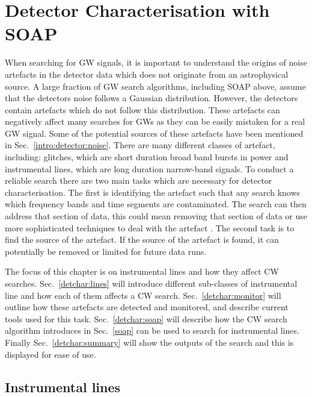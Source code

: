 \chapter{\label{detchar}Detector Characterisation with SOAP}

When searching for \gls{GW} signals, it is important to understand the origins of noise artefacts in the detector data which does not originate from an astrophysical source.
A large fraction of \gls{GW} search algorithms, including SOAP above, assume that the detectors noise follows a Gaussian distribution.
However, the detectors contain artefacts which do not follow this distribution. 
These artefacts can negatively affect many searches for \glspl{GW} as they can be easily mistaken for a real \gls{GW} signal.
Some of the potential sources of these artefacts have been mentioned in Sec.~\ref{intro:detector:noise}. 
There are many different classes of artefact, including: glitches, which are short duration broad band bursts in power and instrumental lines, which are long duration narrow-band signals.
To conduct a reliable search there are two main tasks which are necessary for detector characterisation.
The first is identifying the artefact such that any search knows which frequency bands and time segments are contaminated.
The search can then address that section of data, this could mean removing that section of data or use more sophisticated techniques to deal with the artefact \citep{pankow2018MitigationInstrumental}.
The second task is to find the source of the artefact. 
If the source of the artefact is found, it can potentially be removed or limited for future data runs.

The focus of this chapter is on instrumental lines and how they affect \gls{CW} searches.
Sec.~\ref{detchar:lines} will introduce different sub-classes of instrumental line and how each of them affects a \gls{CW} search.
Sec.~\ref{detchar:monitor} will outline how these artefacts are detected and monitored, and describe current tools used for this task.
Sec.~\ref{detchar:soap} will describe how the \gls{CW} search algorithm introduces in Sec.~\ref{soap} can be used to search for instrumental lines.
Finally Sec.~\ref{detchar:summary} will show the outputs of the search and this is displayed for ease of use.



\section{\label{detchar:lines}Instrumental lines}

